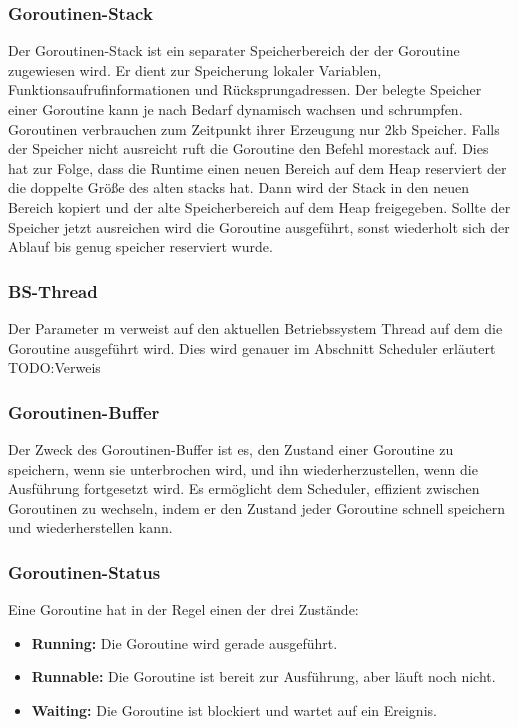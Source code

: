 \documentclass[fontsize=12pt,paper=a4,twoside=semi,parskip=half-,headsepline,headinclude]{scrreprt}
\begin{document}
\subsubsection{Goroutinen-Stack}

 Der Goroutinen-Stack ist ein separater Speicherbereich der der Goroutine zugewiesen wird. Er dient zur Speicherung lokaler Variablen, Funktionsaufrufinformationen und Rücksprungadressen. Der belegte Speicher einer Goroutine kann je nach Bedarf dynamisch wachsen und schrumpfen. Goroutinen verbrauchen zum Zeitpunkt ihrer Erzeugung nur 2kb Speicher. Falls der Speicher nicht ausreicht ruft die Goroutine den Befehl morestack auf. Dies hat zur Folge, dass die Runtime einen neuen Bereich auf dem Heap reserviert der die doppelte Größe des alten stacks hat. Dann wird der Stack in den neuen Bereich kopiert und der  alte Speicherbereich auf dem Heap freigegeben. Sollte der Speicher jetzt ausreichen wird die Goroutine ausgeführt, sonst wiederholt sich der Ablauf bis genug speicher reserviert wurde.
 
\subsubsection{BS-Thread}
 Der Parameter m verweist auf den aktuellen Betriebssystem Thread auf dem die Goroutine ausgeführt wird. Dies wird genauer im Abschnitt Scheduler erläutert TODO:Verweis

\subsubsection{Goroutinen-Buffer}
Der Zweck des Goroutinen-Buffer ist es, den Zustand einer Goroutine zu speichern, wenn sie unterbrochen wird, und ihn wiederherzustellen, wenn die Ausführung fortgesetzt wird. Es ermöglicht dem Scheduler, effizient zwischen Goroutinen zu wechseln, indem er den Zustand jeder Goroutine schnell speichern und wiederherstellen kann.
 
\subsubsection{Goroutinen-Status}

Eine Goroutine hat in der Regel einen der drei Zustände:

\begin{itemize}
	\item \textbf{Running:} Die Goroutine wird gerade ausgeführt.
	\item \textbf{Runnable:} Die Goroutine ist bereit zur Ausführung, aber läuft noch nicht.
	\item \textbf{Waiting:} Die Goroutine ist blockiert und wartet auf ein Ereignis.
\end{itemize}	
	
\end{document}
